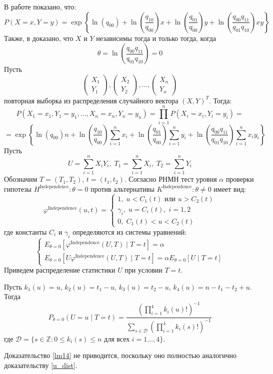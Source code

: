 В работе \cite{Dai2013} показано, что:
$$
P(X=x,Y=y)= \exp \left\{\ln(q_{00}) + 
     \ln \left(\dfrac{q_{10}}{q_{00}}\right) x
    +  \ln \left(\dfrac{q_{01}}{q_{00}}\right) y +
     \ln\left(\dfrac{q_{00}q_{11}}{q_{01}q_{10}}\right) xy
 \right\}
$$
Также, в \cite{Dai2013} доказано, что 
$X$ и $Y$ независимы тогда и только тогда, когда
$$\theta=\ln\left(\dfrac{q_{00}q_{11}}{q_{01}q_{10}}\right)=0$$
Пусть
    $$
        \begin{pmatrix}
            X_1 \\
            Y_1 
        \end{pmatrix},
        \begin{pmatrix}
            X_2 \\
            Y_2
        \end{pmatrix}, \ldots,
        \begin{pmatrix}
            X_n \\
            Y_n
        \end{pmatrix}
    $$ повторная выборка из распределения случайного вектора $(X,Y)^T$. Тогда:
$$
    P(X_1=x_1,Y_1=y_1,\ldots,X_n=x_n,Y_n=y_n)
    =\prod_{i=1}^n P(X_i=x_i,Y_i=y_i) =
    $$
    $$
    =\exp \left\{ \ln(q_{00})n + 
        \ln \left(\dfrac{q_{10}}{q_{00}}\right) \sum_{i=1}^n x_i 
        +\ln \left(\dfrac{q_{01}}{q_{00}}\right) \sum_{i=1}^{n} y_i   +
        \ln\left(\dfrac{q_{00}q_{11}}{q_{01}q_{10}}\right) \sum_{i=1}^n x_i y_i 
     \right\}
    $$
    Пусть 
    $$
    U = \sum_{i=1}^n X_i Y_i,\;
    T_1 = \sum_{i=1}^n X_i,\;
    T_2 = \sum_{i=1}^n Y_i
    $$
    Обозначим $T=(T_1,T_2)$, $t=(t_1,t_2)$.
    Согласно \cite{Lehmann1986} РНМН тест уровня $\alpha$ проверки гипотезы $H^{\text{Independence}}: \theta = 0$ против альтернативы $K^{\text{Independence}}: \theta \neq 0$ 
    имеет вид:
    $$
    \varphi^{\text{Independence}}(u,t)=\begin{cases}
        1, \; u<C_1(t) \text{ или } u>C_2(t)\\
        \gamma_i, \; u=C_i(t), \; i=1,2\\
        0, \; C_1(t)<u<C_2(t)
    \end{cases}
    $$
    где константы $C_i$ и $\gamma_i$ определяются из системы уравнений:
    $$
    \begin{cases}
        E_{\theta=0}[\varphi^{\text{Independence}}(U,T) \mid T=t]=\alpha \\
        E_{\theta=0}[U\varphi^{\text{Independence}}(U,T) \mid T=t]=\alpha E_{\theta=0}[U \mid T=t]
    \end{cases}
    $$
    Приведем распределение статистики $U$ при условии $T=t$.
\begin{lemma}\label{lm14}
    Пусть $k_1(u)=u$, $k_2(u)=t_1-u$, $k_3(u)=t_2-u$,
    $k_4(u)=n-t_1-t_2+u$.
        Тогда
        $$P_{\theta=0}(U=u \mid T=t)=\dfrac{(\prod_{i=1}^4 k_i(u)!)^{-1}}
            {\sum_{s\in \mathcal{D}} (\prod_{i=1}^4 k_i(s)!)^{-1}}$$
        где $\mathcal{D}=\{s \in \mathbb{Z}: 0\leq k_i(s) \leq n \text{ для всех } i=1\ldots,4\}$.
\end{lemma}
Доказательство \autoref{lm14} не приводится, поскольку оно полностью 
аналогично доказательству \autoref{u_dist}.

